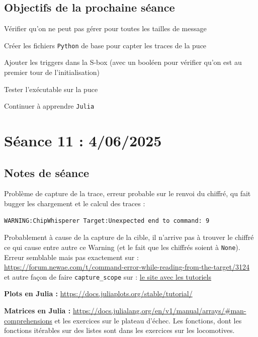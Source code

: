 \documentclass[12pt]{article}
\newcommand{\cmark}{\ding{51}}%
\newcommand{\done}{\rlap{$\square$}{\raisebox{2pt}{\large\hspace{1pt}\cmark}}%
	\hspace{-2.5pt}}
\begin{document}
	\subsection{Objectifs de la prochaine séance}
	\begin{todolist}
		\item[\done] Vérifier qu'on ne peut pas gérer pour toutes les tailles de message
		\item[\done] Créer les fichiers \verb|Python| de base pour capter les traces de la puce
		\item[\done] Ajouter les triggers dans la S-box (avec un booléen pour vérifier qu'on est au premier tour de l'initialisation)
		\item[\done] Tester l'exécutable sur la puce
		\item[\done] Continuer à apprendre \verb|Julia|
	\end{todolist}
	
	
	\section{Séance 11 : 4/06/2025}
	\subsection{Notes de séance}
	Problème de capture de la trace, erreur probable sur le renvoi du chiffré, qu fait bugger les chargement et le calcul des traces : 
	
	\begin{lstlisting}
WARNING:ChipWhisperer Target:Unexpected end to command: 9
	\end{lstlisting}
	
	\noindent Probablement à cause de la capture de la cible, il n'arrive pas à trouver le chiffré ce qui cause entre autre ce Warning (et le fait que les chiffrés soient à \verb|None|).\\
	Erreur semblable mais pas exactement sur : \url{https://forum.newae.com/t/command-error-while-reading-from-the-target/3124} et autre façon de faire \verb|capture_scope| sur : \href{https://github.com/newaetech/chipwhisperer-jupyter/blob/caefc398b8545ddd237a5a7c249d1e601e46d688/courses/sca101/generators/Lab2_1B%20-%20GENERATOR.ipynb}{le site avec les tutoriels}
	
	\noindent \textbf{Plots en Julia :} \url{https://docs.juliaplots.org/stable/tutorial/}
	
	\noindent \textbf{Matrices en Julia :} \url{https://docs.julialang.org/en/v1/manual/arrays/#man-comprehensions} et les exercices sur le plateau d'échec. Les fonctions, dont les fonctions itérables sur des listes sont dans les exercices sur les locomotives.
	
\end{document}
